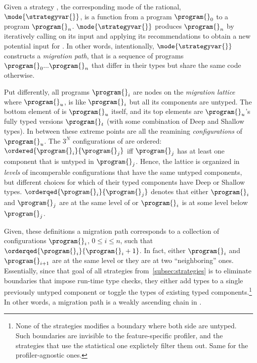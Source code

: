 Given a strategy \strategyvar{}, the corresponding mode of the rational, 
$\mode{\strategyvar{}}$, is a function from a program $\program{}_0$ to a
program $\program{}_n$. $\mode{\strategyvar{}}$ produces  $\program{}_n$
by iteratively calling \strategyvar{} on its input and applying its
recommendations to obtain a new potential input for \strategyvar{}. 
In other words, intentionally,  $\mode{\strategyvar{}}$ constructs a
\emph{migration path}, that is a sequence of programs 
${\program{}_0} ... {\program{}_n}$ that differ in their types but share
the same code otherwise.

Put differently, all programs $\program{}_i$ are nodes on the
\emph{migration lattice}  where ${\program{}_u}$, is
like ${\program{}_i}$ but all its components are untyped. The bottom
element of  is ${\program{}_u}$ itself, and its top
elements are ${\program{}_u}$'s fully typed versions $\program{}_t$ (with some
combination of Deep and Shallow types). In between these extreme points
are all the reamining \emph{configurations} of $\program{}_u$. The $3^N$
configurations of   are ordered:
$\ordered{\program{}_i}{\program{}_j}$ iff $\program{}_j$ has at least one
component that is untyped in $\program{}_j$. Hence, the lattice is
organized in \emph{levels} of incomperable configurations that have the same
untyped components, but different choices for which of their typed
components have Deep or Shallow types.
$\orderqed{\program{}_i}{\program{}_j}$ denotes that either $\program{}_i$
and $\program{}_j$ are at the same level of  or
$\program{}_i$ is at some level below $\program{}_j$.

Given, these definitions a migration path corresponds to a collection of
configurations  $\program{}_i$, $0 \leq  i \leq n$, such that
$\orderqed{\program{}_i}{\program{}_i+1}$. In fact, either  $\program{}_i$
and $\program{}_{i+1}$ are at the same level or they are at two
``neighboring'' ones.  Essentially, since that goal of all strategies
from~\ref{subsec:strategies} is to eliminate  boundaries that impose
run-time type checks, they either add types to a single previously
untyped component or toggle the types of existing typed
components.\footnote{None of the strategies modifies a boundary where both
side are untyped. Such boundaries are invisible to the feature-specific
profiler, and the strategies that use the statistical one explictely
filter them out. Same for the profiler-agnostic ones.} 
In other words, a migration path is a weakly ascending
chain in .

